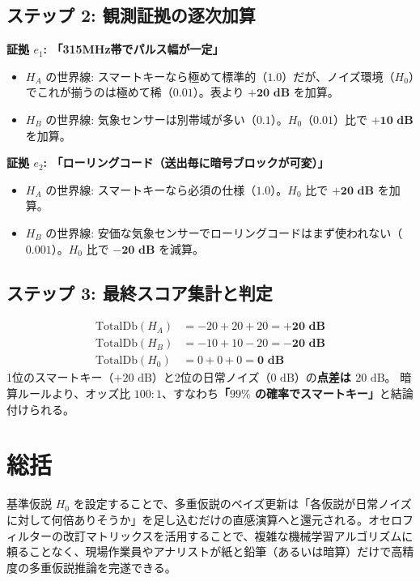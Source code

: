 \subsection{ステップ 2: 観測証拠の逐次加算}
\textbf{証拠 $e_1$: 「315MHz帯でパルス幅が一定」}
\begin{itemize}
    \item $H_A$ の世界線: スマートキーなら極めて標準的（$1.0$）だが、ノイズ環境（$H_0$）でこれが揃うのは極めて稀（$0.01$）。表より $\mathbf{+20\text{ dB}}$ を加算。
    \item $H_B$ の世界線: 気象センサーは別帯域が多い（$0.1$）。$H_0$（$0.01$）比で $\mathbf{+10\text{ dB}}$ を加算。
\end{itemize}

\textbf{証拠 $e_2$: 「ローリングコード（送出毎に暗号ブロックが可変）」}
\begin{itemize}
    \item $H_A$ の世界線: スマートキーなら必須の仕様（$1.0$）。$H_0$ 比で $\mathbf{+20\text{ dB}}$ を加算。
    \item $H_B$ の世界線: 安価な気象センサーでローリングコードはまず使われない（$0.001$）。$H_0$ 比で $\mathbf{-20\text{ dB}}$ を減算。
\end{itemize}

\subsection{ステップ 3: 最終スコア集計と判定}
\begin{align}
\text{TotalDb}(H_A) &= -20 + 20 + 20 = \mathbf{+20\text{ dB}} \\
\text{TotalDb}(H_B) &= -10 + 10 - 20 = \mathbf{-20\text{ dB}} \\
\text{TotalDb}(H_0) &= 0 + 0 + 0 = \mathbf{0\text{ dB}}
\end{align}
1位のスマートキー（$+20\text{ dB}$）と2位の日常ノイズ（$0\text{ dB}$）の\textbf{点差は $20\text{ dB}$}。
暗算ルールより、オッズ比 $100:1$、すなわち\textbf{「$99\%$ の確率でスマートキー」}と結論付けられる。

\section{総括}
基準仮説 $H_0$ を設定することで、多重仮説のベイズ更新は「各仮説が日常ノイズに対して何倍ありそうか」を足し込むだけの直感演算へと還元される。オセロフィルターの改訂マトリックスを活用することで、複雑な機械学習アルゴリズムに頼ることなく、現場作業員やアナリストが紙と鉛筆（あるいは暗算）だけで高精度の多重仮説推論を完遂できる。
